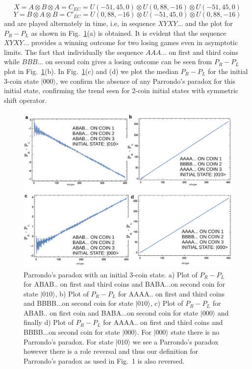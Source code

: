 \documentclass[english,aps,pra,amsmath,amssymb,showpacs,notitlepage,onecolumn]{revtex4-1}
\begin{document}
\begin{equation*}
X=A \otimes B \otimes A =C_{EC}=U(-51,45,0) \otimes U(0,88,-16) \otimes U(-51,45,0)
\end{equation*}
\begin{equation*}
Y=B \otimes A \otimes B =C'_{EC}=U(0,88,-16) \otimes U(-51,45,0) \otimes U(0,88,-16)
\end{equation*}
and are played alternately in time, i.e, in sequence $XYXY\ldots$ and the plot for $P_R -P_L$ as shown in Fig.~\ref{result3}(a) is obtained. It is evident that the sequence $XYXY\ldots$ provides a winning outcome for two losing games even in asymptotic limits. The fact that individually the sequence $AAA\ldots$ on first and third coins while $BBB\ldots$ on second coin gives a losing outcome can be seen from $P_R-P_L$ plot in Fig.~\ref{result3}(b). In Fig.~\ref{result3}(c) and (d) we plot the median $P_R - P_L$ for the initial 3-coin state $|000\rangle$, we confirm the absence of any Parrondo's paradox for this initial state, confirming the trend seen for 2-coin initial states with symmetric shift operator.
\begin{figure}[H]
\centering 
\includegraphics[width=.793\textwidth]{010.pdf}
\caption{ Parrondo's paradox with an initial 3-coin state. a) Plot of  $P_{R}-P_{L}$ for ABAB.. on first and third coins and BABA...on second coin for state $|010\rangle$, b) Plot of  $P_{R}-P_{L}$ for AAAA.. on first and third coins and BBBB...on second coin for state $|010\rangle$, c) Plot of  $P_{R}-P_{L}$ for ABAB.. on first coin and BABA...on second coin for state $|000\rangle$ and finally d) Plot of  $P_{R}-P_{L}$ for AAAA.. on first and third coins and BBBB...on second coin for state $|000\rangle$. For  $|000\rangle$ state there is no Parrondo's paradox. For state $|010\rangle$ we see a Parrondo's paradox however there is a role reversal and thus our definition for Parrondo's paradox as used in Fig.~1 is also reversed. }
\label{result3}
\end{figure}
\end{document}
